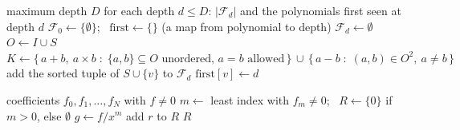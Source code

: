 \documentclass[11pt]{article}
\theoremstyle{definition}
\theoremstyle{remark}
\newcommand{\Z}{\mathbb{Z}}
\begin{document}
\begin{algorithm}[t]
\caption{Reached-set census by breadth-first search, with exact first-appearance depths.}
\label{alg:bfs}
\begin{algorithmic}[1]
\Require maximum depth $D$
\Ensure for each depth $d \le D$: $|\mathcal{F}_d|$ and the polynomials first seen at depth $d$
\State $\mathcal{F}_0 \gets \{\emptyset\}$; \ $\mathrm{first} \gets \{\}$ (a map from polynomial to depth)
  \State $\mathcal{F}_d \gets \emptyset$
    \State $O \gets I \cup S$ 
    \State $K \gets \{\, a + b,\ a \times b \;:\; \{a, b\} \subseteq O \text{ unordered, } a = b \text{ allowed} \,\} \,\cup\, \{\, a - b \;:\; (a, b) \in O^2,\ a \ne b \,\}$
      \State add the sorted tuple of $S \cup \{v\}$ to $\mathcal{F}_d$ 
       $\mathrm{first}[v] \gets d$ \EndIf
    \EndFor
  \EndFor
\EndFor
\end{algorithmic}
\end{algorithm}

\begin{algorithm}[t]
\caption{Exact count of distinct integer roots of a nonzero $f \in \Z[x]$.}
\label{alg:roots}
\begin{algorithmic}[1]
\Require coefficients $f_0, f_1, \dots, f_N$ with $f \ne 0$
\State $m \gets$ least index with $f_m \ne 0$; \ $R \gets \{0\}$ if $m > 0$, else $\emptyset$
\State $g \gets f / x^m$
     add $r$ to $R$ \EndIf
  \EndFor
\EndIf
\State \Return $R$
\end{algorithmic}
\end{algorithm}
\end{document}
